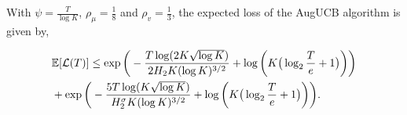 \begin{theorem}
\label{Result:Theorem:1}
With $\psi=\frac{T}{\log K}$, $\rho_{\mu}=\frac{1}{8}$ and $\rho_v=\frac{1}{3}$,
the expected loss of the AugUCB algorithm is given by,
\begin{small}
\begin{align*}
&\mathbb{E}[\mathcal{L}(T)] \leq \exp\bigg( -\frac{T\log (2 K\sqrt{\log K})}{2H_2 K (\log K)^{3/2}} + \log\bigg(K\big(\log_2\frac{T}{e}+1\big)\bigg)\bigg)\\
& + \exp\bigg(- \frac{5T\log ( K\sqrt{\log K})}{H_{2}^{\sigma} K(\log K)^{3/2}}  + \log\bigg(K\big(\log_2\frac{T}{e}+1\big)\bigg)\bigg).
\end{align*}
\end{small}
\end{theorem}

